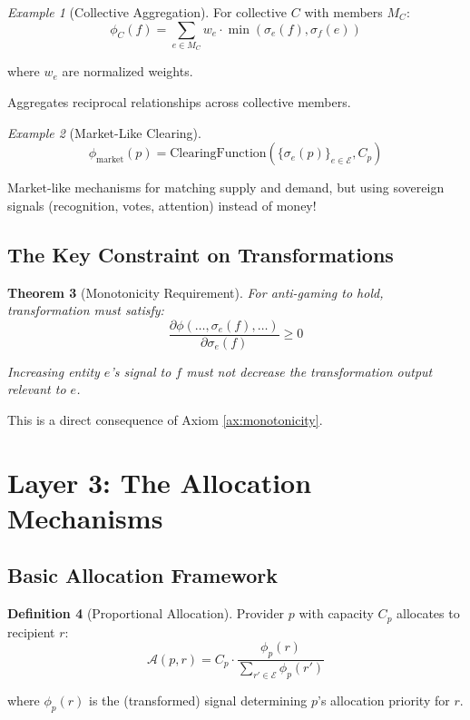 \documentclass[11pt,a4paper]{article}
\newtheorem{theorem}{Theorem}[section]
\theoremstyle{definition}
\newtheorem{definition}[theorem]{Definition}
\theoremstyle{remark}
\newtheorem{example}[theorem]{Example}
\newcommand{\E}{\mathcal{E}}
\newcommand{\A}{\mathcal{A}}
\begin{document}
\begin{example}[Collective Aggregation]
For collective $C$ with members $M_C$:
\[ \phi_C(f) = \sum_{e \in M_C} w_e \cdot \min(\sigma_e(f), \sigma_f(e)) \]

where $w_e$ are normalized weights.

Aggregates reciprocal relationships across collective members.
\end{example}

\begin{example}[Market-Like Clearing]
\[ \phi_{\text{market}}(p) = \text{ClearingFunction}(\{\sigma_e(p)\}_{e \in \E}, C_p) \]

Market-like mechanisms for matching supply and demand, but using sovereign signals (recognition, votes, attention) instead of money!
\end{example}

\subsection{The Key Constraint on Transformations}

\begin{theorem}[Monotonicity Requirement]
For anti-gaming to hold, transformation must satisfy:
\[ \frac{\partial \phi(\ldots, \sigma_e(f), \ldots)}{\partial \sigma_e(f)} \ge 0 \]

Increasing entity $e$'s signal to $f$ must not decrease the transformation output relevant to $e$.
\end{theorem}

This is a direct consequence of Axiom \ref{ax:monotonicity}.

\section{Layer 3: The Allocation Mechanisms}

\subsection{Basic Allocation Framework}

\begin{definition}[Proportional Allocation]
Provider $p$ with capacity $C_p$ allocates to recipient $r$:
\[ \A(p,r) = C_p \cdot \frac{\phi_p(r)}{\sum_{r' \in \E} \phi_p(r')} \]

where $\phi_p(r)$ is the (transformed) signal determining $p$'s allocation priority for $r$.
\end{definition}
\end{document}
